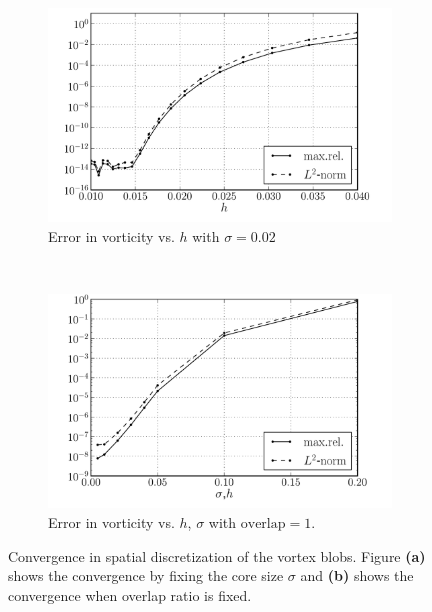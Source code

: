 	\begin{figure}[!t]
	        \centering
	        \begin{subfigure}[b]{0.5\textwidth}
	                \includegraphics[width=\textwidth]{figures/lagrangian/lambOseen_convergence_dx_sigma0p02_compressed.pdf}
	                \caption{Error in vorticity vs. $h$ with $\sigma = 0.02$}
	                \label{fig:lambOseen_convergence_dx_sigma0p02_compressed}
	        \end{subfigure}%
	        ~ %
	        \begin{subfigure}[b]{0.5\textwidth}
	                \includegraphics[width=\textwidth]{figures/lagrangian/lambOseen_convergence_dx_compressed.pdf}
	                \caption{Error in vorticity vs. $h$, $\sigma$ with $\mathrm{overlap}=1$.}
	                \label{fig:lambOseen_convergence_dx_compressed}
	        \end{subfigure}
	        \caption{Convergence in spatial discretization of the vortex blobs. Figure \textbf{(a)} shows the convergence by fixing the core size $\sigma$ and \textbf{(b)} shows the convergence when overlap ratio is fixed.}
	        \label{fig:lambOseen_convergence_dx}
	\end{figure}

